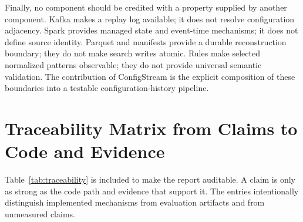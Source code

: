 \documentclass[a4paper,11pt]{article}
\begin{document}
Finally, no component should be credited with a property supplied by another component. Kafka makes a replay log available; it does not resolve configuration adjacency. Spark provides managed state and event-time mechanisms; it does not define source identity. Parquet and manifests provide a durable reconstruction boundary; they do not make search writes atomic. Rules make selected normalized patterns observable; they do not provide universal semantic validation. The contribution of ConfigStream is the explicit composition of these boundaries into a testable configuration-history pipeline.

\section{Traceability Matrix from Claims to Code and Evidence}
\label{app:traceability}

Table~\ref{tab:traceability} is included to make the report auditable. A claim is only as strong as the code path and evidence that support it. The entries intentionally distinguish implemented mechanisms from evaluation artifacts and from unmeasured claims.
\end{document}
